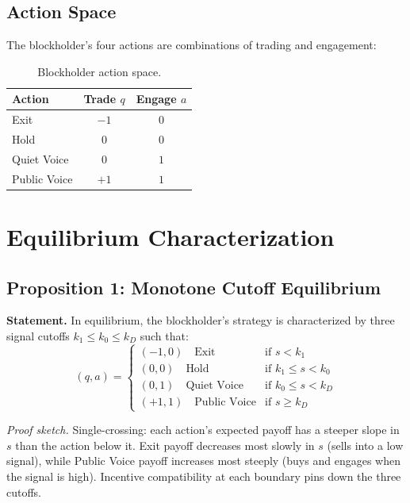 \documentclass[11pt,a4paper]{article}
\newcommand{\1}{\mathbf{1}}
\begin{document}
\subsection{Action Space}

The blockholder's four actions are combinations of trading and engagement:

\begin{table}[H]
\centering
\caption{Blockholder action space.}
\label{tab:actions}
\begin{tabular}{@{}lcc@{}}
\toprule
\textbf{Action} & \textbf{Trade $q$} & \textbf{Engage $a$} \\
\midrule
Exit         & $-1$ & $0$ \\
Hold         & $0$  & $0$ \\
Quiet Voice  & $0$  & $1$ \\
Public Voice & $+1$ & $1$ \\
\bottomrule
\end{tabular}
\end{table}


\section{Equilibrium Characterization}

\subsection{Proposition 1: Monotone Cutoff Equilibrium}

\textbf{Statement.}
In equilibrium, the blockholder's strategy is characterized by three
signal cutoffs $k_1 \leq k_0 \leq k_D$ such that:
\[
(q, a) =
\begin{cases}
(-1, 0) \quad \text{Exit}         & \text{if } s < k_1 \\
(0, 0)  \quad \text{Hold}         & \text{if } k_1 \leq s < k_0 \\
(0, 1)  \quad \text{Quiet Voice}  & \text{if } k_0 \leq s < k_D \\
(+1, 1) \quad \text{Public Voice} & \text{if } s \geq k_D
\end{cases}
\]

\textit{Proof sketch.}
Single-crossing: each action's expected payoff has a steeper slope in $s$
than the action below it. Exit payoff decreases most slowly in $s$ (sells
into a low signal), while Public Voice payoff increases most steeply
(buys and engages when the signal is high). Incentive compatibility at
each boundary pins down the three cutoffs.
\end{document}

